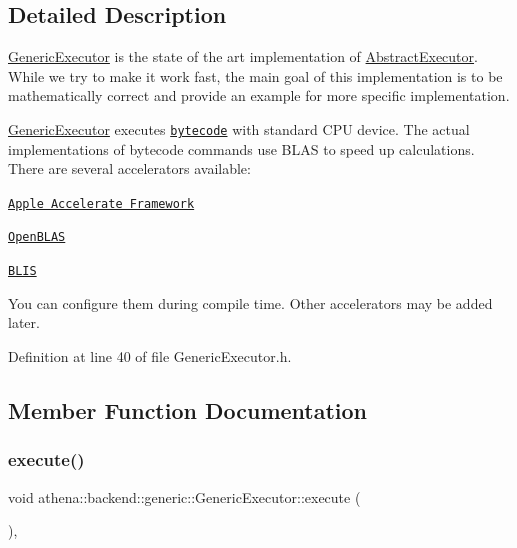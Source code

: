 \subsection{Detailed Description}
\mbox{\hyperlink{classathena_1_1backend_1_1generic_1_1_generic_executor}{Generic\+Executor}} is the state of the art implementation of \mbox{\hyperlink{classathena_1_1backend_1_1_abstract_executor}{Abstract\+Executor}}. While we try to make it work fast, the main goal of this implementation is to be mathematically correct and provide an example for more specific implementation. 

\mbox{\hyperlink{classathena_1_1backend_1_1generic_1_1_generic_executor}{Generic\+Executor}} executes \href{https://athenaframework.ml/athena/bytecode/basics.html}{\tt bytecode} with standard C\+PU device. The actual implementations of bytecode commands use B\+L\+AS to speed up calculations. There are several accelerators available\+: 
\begin{DoxyItemize}
\item \href{https://developer.apple.com/documentation/accelerate}{\tt Apple Accelerate Framework}  
\item \href{https://github.com/xianyi/OpenBLAS.git}{\tt Open\+B\+L\+AS}  
\item \href{https://github.com/flame/blis.git}{\tt B\+L\+IS}  
\end{DoxyItemize}You can configure them during compile time. Other accelerators may be added later. 

Definition at line 40 of file Generic\+Executor.\+h.



\subsection{Member Function Documentation}
\mbox{\label{classathena_1_1backend_1_1generic_1_1_generic_executor_a38b56c284050d31198b28fcb6595bc73}} 
\subsubsection{\texorpdfstring{execute()}{execute()}}
{\footnotesize\ttfamily void athena\+::backend\+::generic\+::\+Generic\+Executor\+::execute (\begin{DoxyParamCaption}{ }\end{DoxyParamCaption})\hspace{0.3cm}{\ttfamily [override]}, {\ttfamily [virtual]}}

